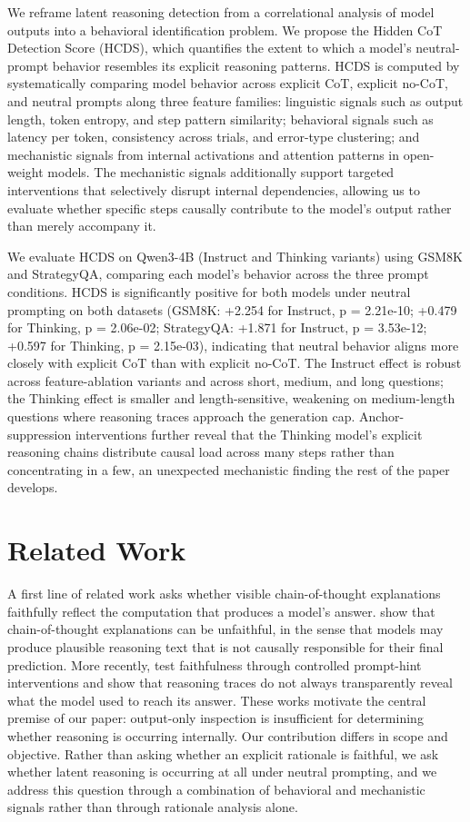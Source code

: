 \documentclass{article}
\theoremstyle{plain}
\theoremstyle{definition}
\theoremstyle{remark}
\begin{document}
We reframe latent reasoning detection from a correlational analysis of model outputs into a behavioral identification problem. We propose the Hidden CoT Detection Score (HCDS), which quantifies the extent to which a model's neutral-prompt behavior resembles its explicit reasoning patterns. HCDS is computed by systematically comparing model behavior across explicit CoT, explicit no-CoT, and neutral prompts along three feature families: linguistic signals such as output length, token entropy, and step pattern similarity; behavioral signals such as latency per token, consistency across trials, and error-type clustering; and mechanistic signals from internal activations and attention patterns in open-weight models. The mechanistic signals additionally support targeted interventions that selectively disrupt internal dependencies, allowing us to evaluate whether specific steps causally contribute to the model's output rather than merely accompany it.

We evaluate HCDS on Qwen3-4B (Instruct and Thinking variants) using GSM8K and StrategyQA, comparing each model's behavior across the three prompt conditions. HCDS is significantly positive for both models under neutral prompting on both datasets (GSM8K: +2.254 for Instruct, p = 2.21e-10; +0.479 for Thinking, p = 2.06e-02; StrategyQA: +1.871 for Instruct, p = 3.53e-12; +0.597 for Thinking, p = 2.15e-03), indicating that neutral behavior aligns more closely with explicit CoT than with explicit no-CoT. The Instruct effect is robust across feature-ablation variants and across short, medium, and long questions; the Thinking effect is smaller and length-sensitive, weakening on medium-length questions where reasoning traces approach the generation cap. Anchor-suppression interventions further reveal that the Thinking model's explicit reasoning chains distribute causal load across many steps rather than concentrating in a few, an unexpected mechanistic finding the rest of the paper develops.


\section{Related Work}

A first line of related work asks whether visible chain-of-thought explanations faithfully reflect the computation that produces a model's answer. \citet{turpin_language_2023} show that chain-of-thought explanations can be unfaithful, in the sense that models may produce plausible reasoning text that is not causally responsible for their final prediction. More recently, \citet{chen_reasoning_2025} test faithfulness through controlled prompt-hint interventions and show that reasoning traces do not always transparently reveal what the model used to reach its answer. These works motivate the central premise of our paper: output-only inspection is insufficient for determining whether reasoning is occurring internally. Our contribution differs in scope and objective. Rather than asking whether an explicit rationale is faithful, we ask whether latent reasoning is occurring at all under neutral prompting, and we address this question through a combination of behavioral and mechanistic signals rather than through rationale analysis alone.
\end{document}
